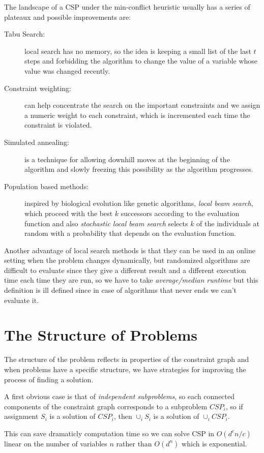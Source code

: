 The landscape of a CSP under the min-conflict heuristic usually has a series of 
plateaux and possible improvements are:
\begin{description}
    \item [Tabu Search: ] local search has no memory, so the idea is keeping a small
	    list of the last $t$ steps and forbidding the algorithm to change the value
	    of a variable whose value was changed recently.
    \item [Constraint weighting: ] can help concentrate the search on the important
	    constraints and we assign a numeric weight to each constraint, which
            is incremented each time the constraint is violated.
    \item [Simulated annealing: ] is a technique for allowing downhill moves at the 
	    beginning of the algorithm and slowly freezing this possibility as the 
	    algorithm progresses.
    \item [Population based methods: ] inspired by biological evolution like 
	    genetic algorithms, \emph{local beam search}, which proceed with the 
	    best $k$ successors according to the evaluation function and also
	    \emph{stochastic local beam search} selects $k$ of the individuals at
	    random with a probability that depends on the evaluation function.
\end{description}
Another advantage of local search methods is that they can be used in an online 
setting when the problem changes dynamically, but randomized algorithms are difficult
to evaluate since they give a different result and a different execution time each
time they are run, so we have to take \emph{average/median runtime} but this definition
is ill defined since in case of algorithms that never ends we can't evaluate it.

\section{The Structure of Problems}
The structure of the problem reflects in properties of the constraint graph and 
when problems have a specific structure, we have strategies for improving the process
of finding a solution.

A first obvious case is that of \emph{independent subproblems}, so each connected
components of the constraint graph corresponds to a subproblem $CSP_i$, so if 
assignment $S_i$ is a solution of $CSP_i$, then $\cup _i S_i$ is a solution of 
$\cup_i CSP_i$.

This can save dramaticly computation time so we can solve CSP in $O(d^c n/c)$ linear
on the number of variables $n$ rather than $O(d^n)$ which is exponential.

